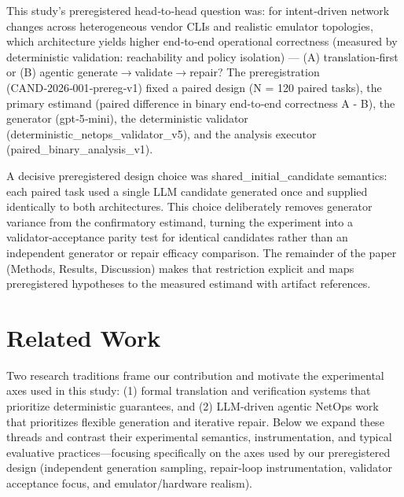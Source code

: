 \documentclass[conference]{IEEEtran}
\begin{document}
This study's preregistered head‑to‑head question was: for intent‑driven network changes across heterogeneous vendor CLIs and realistic emulator topologies, which architecture yields higher end‑to‑end operational correctness (measured by deterministic validation: reachability and policy isolation) --- (A) translation‑first or (B) agentic generate\ensuremath{\rightarrow}validate\ensuremath{\rightarrow}repair? The preregistration (CAND‑2026‑001‑prereg‑v1) fixed a paired design (N = 120 paired tasks), the primary estimand (paired difference in binary end‑to‑end correctness A - B), the generator (gpt‑5‑mini), the deterministic validator (deterministic\_netops\_validator\_v5), and the analysis executor (paired\_binary\_analysis\_v1).

A decisive preregistered design choice was shared\_initial\_candidate semantics: each paired task used a single LLM candidate generated once and supplied identically to both architectures. This choice deliberately removes generator variance from the confirmatory estimand, turning the experiment into a validator‑acceptance parity test for identical candidates rather than an independent generator or repair efficacy comparison. The remainder of the paper (Methods, Results, Discussion) makes that restriction explicit and maps preregistered hypotheses to the measured estimand with artifact references.

\section{Related Work}
Two research traditions frame our contribution and motivate the experimental axes used in this study: (1) formal translation and verification systems that prioritize deterministic guarantees, and (2) LLM‑driven agentic NetOps work that prioritizes flexible generation and iterative repair. Below we expand these threads and contrast their experimental semantics, instrumentation, and typical evaluative practices---focusing specifically on the axes used by our preregistered design (independent generation sampling, repair‑loop instrumentation, validator acceptance focus, and emulator/hardware realism).
\end{document}
